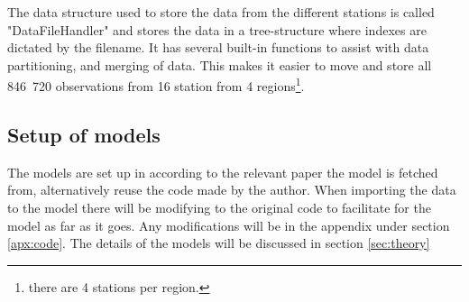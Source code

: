 The data structure used to store the data from the different stations is called "DataFileHandler" and stores the data in a tree-structure where indexes are dictated by the filename. It has several built-in functions to assist with data partitioning, and merging of data. This makes it easier to move and store all 846 720 observations from 16 station from 4 regions\footnote{there are 4 stations per region.}. 

\subsection{Setup of models}

The models are set up in according to the relevant paper the model is fetched from, alternatively reuse the code made by the author. When importing the data to the model there will be modifying to the original code to facilitate for the model as far as it goes. Any modifications will be in the appendix under section \ref{apx:code}. The details of the models will be discussed in section \ref{sec:theory}
